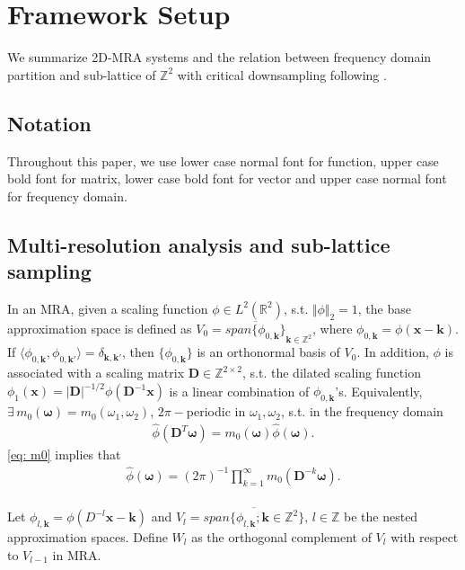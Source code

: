 \section{Framework Setup}\label{sec: setup}
We summarize 2D-MRA systems and the relation between frequency domain partition and sub-lattice of $\mathbb{Z}^2$ with critical downsampling following \cite{yin2014orthshear}.

\subsection{Notation}
Throughout this paper, we use lower case normal font for function, upper case bold font for matrix, lower case bold font for vector and upper case normal font for frequency domain.

\subsection{Multi-resolution analysis and sub-lattice sampling}
In an MRA, given a scaling function $\phi\in L^2(\mathbb{R}^2)$, s.t. $\Vert\phi\Vert_2=1$,
the base approximation space is defined as $V_0 = \overline{span\{\phi_{0,\boldsymbol{k}}\}}_{\boldsymbol{k}\in\mathbb{Z}^2}$, where $\phi_{0,\boldsymbol{k}} = \phi(\boldsymbol{x}-\boldsymbol{k})$. If $\langle \phi_{0,\boldsymbol{k}},\phi_{0,\boldsymbol{k'}}\rangle = \delta_{\boldsymbol{k,k'}}$, then $\{\phi_{0,\boldsymbol{k}}\}$ is an orthonormal basis of $V_0$. In addition, $\phi$ is associated with a scaling matrix $\mathbf{D}\in\mathbb{Z}^{2\times 2}$, s.t. the dilated scaling function
 $\phi_1(\boldsymbol{x}) = |\mathbf{D}|^{-1/2}\phi(\mathbf{D}^{-1}\boldsymbol{x})$ is a linear combination of $\phi_{0,\boldsymbol{k}}$'s.
Equivalently, $\exists\,m_0(\boldsymbol{\omega}) = m_0(\omega_1,\omega_2)$, $2\pi-$periodic in $\omega_1,\omega_2$, s.t. in the frequency domain
\begin{align}\label{eq: m0}
\widehat{\phi}(\mathbf{D}^T\boldsymbol{\omega}) = m_0(\boldsymbol{\omega})\widehat{\phi}(\boldsymbol{\omega}).
\end{align}
\eqref{eq: m0} implies that
\begin{align}\label{eq: phi-m0}
\textstyle \hat{\phi}(\boldsymbol{\omega}) = (2\pi)^{-1}\prod_{k=1}^{\infty}m_0(\mathbf{D}^{-k} \boldsymbol{\omega}).
\end{align}
\\[.2em]
Let $\phi_{l,\boldsymbol{k}} = \phi(D^{-l}\boldsymbol{x}-\boldsymbol{k})$
and $V_l = \overline{span\{\phi_{l,\boldsymbol{k}};\boldsymbol{k}\in\mathbb{Z}^2\}},\,l\in\mathbb{Z}$ be the nested approximation spaces. Define $W_l$ as the orthogonal complement of $V_l$ with respect to $V_{l-1}$ in MRA. 
